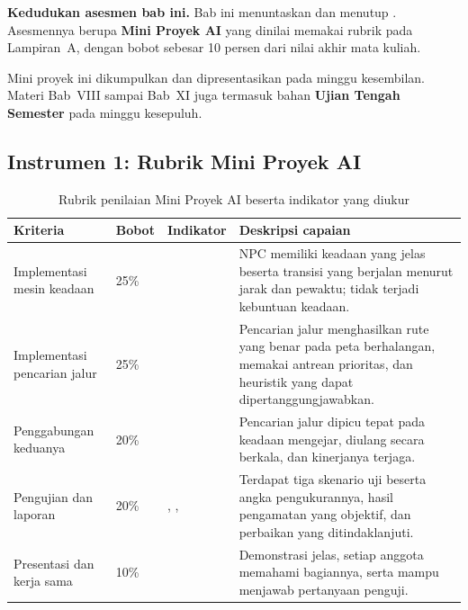 \label{sec:asesmen-integrasi}

\begin{asesmenbox}
\textbf{Kedudukan asesmen bab ini.} Bab ini menuntaskan  dan
menutup . Asesmennya berupa \textbf{Mini Proyek AI} yang dinilai
memakai rubrik pada Lampiran~A, dengan bobot  sebesar 10 persen dari
nilai akhir mata kuliah.

\vspace{0.4em}
Mini proyek ini dikumpulkan dan dipresentasikan pada minggu kesembilan. Materi
Bab~VIII sampai Bab~XI juga termasuk bahan \textbf{Ujian Tengah Semester} pada
minggu kesepuluh.
\end{asesmenbox}

\subsection*{Instrumen 1: Rubrik Mini Proyek AI}

\begin{table}[htbp]
\centering
\caption{Rubrik penilaian Mini Proyek AI beserta indikator yang diukur}
\label{tab:rubrik-mini-proyek-bab11}
{\setlength{\tabcolsep}{4pt}\footnotesize%
\begin{tabularx}{\textwidth}{@{}L{3.4cm} C{1.2cm} C{2.1cm} Y@{}}
\toprule
\headrow \textbf{Kriteria} & \textbf{Bobot} & \textbf{Indikator} & \textbf{Deskripsi capaian} \\
\midrule
Implementasi mesin keadaan & 25\% &  &
NPC memiliki keadaan yang jelas beserta transisi yang berjalan menurut jarak
dan pewaktu; tidak terjadi kebuntuan keadaan. \\
\addlinespace
Implementasi pencarian jalur & 25\% &  &
Pencarian jalur menghasilkan rute yang benar pada peta berhalangan, memakai
antrean prioritas, dan heuristik yang dapat dipertanggungjawabkan. \\
\addlinespace
Penggabungan keduanya & 20\% &  &
Pencarian jalur dipicu tepat pada keadaan mengejar, diulang secara berkala,
dan kinerjanya terjaga. \\
\addlinespace
Pengujian dan laporan & 20\% & , ,  &
Terdapat tiga skenario uji beserta angka pengukurannya, hasil pengamatan yang
objektif, dan perbaikan yang ditindaklanjuti. \\
\addlinespace
Presentasi dan kerja sama & 10\% &  &
Demonstrasi jelas, setiap anggota memahami bagiannya, serta mampu menjawab
pertanyaan penguji. \\
\bottomrule
\end{tabularx}}
\end{table}

